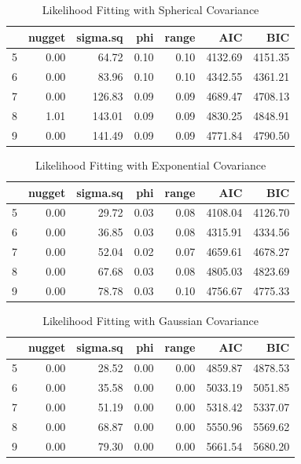 \documentclass[hidelinks,12pt]{article}
\begin{document}
	\begin{table}[!ht]
		\centering
		\caption{Likelihood Fitting with Spherical Covariance \label{tbl:liksph}}
		\begin{tabular}{rrrrrrr}
			\hline
			& nugget & sigma.sq & phi & range & AIC & BIC \\ 
			\hline
			5 & 0.00 & 64.72 & 0.10 & 0.10 & 4132.69 & 4151.35 \\ 
			6 & 0.00 & 83.96 & 0.10 & 0.10 & 4342.55 & 4361.21 \\ 
			7 & 0.00 & 126.83 & 0.09 & 0.09 & 4689.47 & 4708.13 \\ 
			8 & 1.01 & 143.01 & 0.09 & 0.09 & 4830.25 & 4848.91 \\ 
			9 & 0.00 & 141.49 & 0.09 & 0.09 & 4771.84 & 4790.50 \\ 
			\hline
		\end{tabular}
	\end{table}
	\begin{table}[!ht]
		\centering
		\caption{Likelihood Fitting with Exponential Covariance \label{tbl:likexp}}
		\begin{tabular}{rrrrrrr}
			\hline
			& nugget & sigma.sq & phi & range & AIC & BIC \\ 
			\hline
			5 & 0.00 & 29.72 & 0.03 & 0.08 & 4108.04 & 4126.70 \\ 
			6 & 0.00 & 36.85 & 0.03 & 0.08 & 4315.91 & 4334.56 \\ 
			7 & 0.00 & 52.04 & 0.02 & 0.07 & 4659.61 & 4678.27 \\ 
			8 & 0.00 & 67.68 & 0.03 & 0.08 & 4805.03 & 4823.69 \\ 
			9 & 0.00 & 78.78 & 0.03 & 0.10 & 4756.67 & 4775.33 \\ 
			\hline
		\end{tabular}
	\end{table}
	\begin{table}[!ht]
		\centering
		\caption{Likelihood Fitting with Gaussian Covariance \label{tbl:likgau}}
		\begin{tabular}{rrrrrrr}
			\hline
			& nugget & sigma.sq & phi & range & AIC & BIC \\ 
			\hline
			5 & 0.00 & 28.52 & 0.00 & 0.00 & 4859.87 & 4878.53 \\ 
			6 & 0.00 & 35.58 & 0.00 & 0.00 & 5033.19 & 5051.85 \\ 
			7 & 0.00 & 51.19 & 0.00 & 0.00 & 5318.42 & 5337.07 \\ 
			8 & 0.00 & 68.87 & 0.00 & 0.00 & 5550.96 & 5569.62 \\ 
			9 & 0.00 & 79.30 & 0.00 & 0.00 & 5661.54 & 5680.20 \\ 
			\hline
		\end{tabular}
	\end{table}
\end{document}
